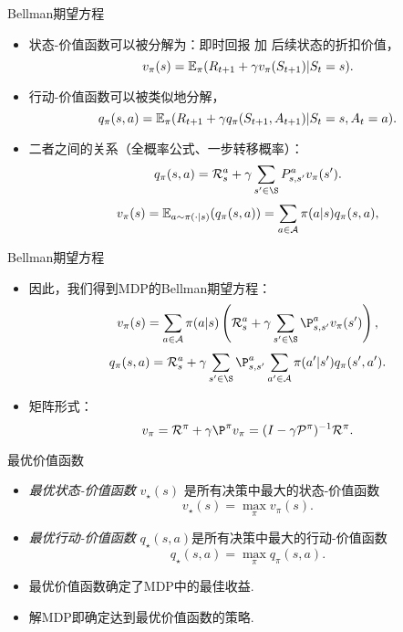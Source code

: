\begin{frame}{Bellman期望方程}
\begin{itemize}
    \item 状态-价值函数可以被分解为：即时回报 加 后续状态的折扣价值，
\[v_\pi(s) = \mathbb{E}_\pi(R_{t+1} + \gamma v_\pi(S_{t+1})|S_t=s).\]
\item 行动-价值函数可以被类似地分解，
\[q_\pi(s,a) = \mathbb{E}_\pi(R_{t+1} + \gamma q_\pi(S_{t+1},A_{t+1})|S_t=s,A_t=a).\]
\item 二者之间的关系（全概率公式、一步转移概率）：
\[q_\pi(s,a) =\mathcal R_s^a + \gamma \sum_{s'\in \S}P_{s,s'}^a v_\pi(s').\]
\[v_\pi(s) = \mathbb{E}_{a\sim\pi(\cdot|s)}(q_\pi(s,a))=\sum_{a\in\mathcal A}\pi(a|s)q_\pi(s,a),\]
\end{itemize}
\end{frame}

\begin{frame}{Bellman期望方程}
\begin{itemize}
    \item 因此，我们得到MDP的Bellman期望方程：
\[v_\pi(s) = \sum_{a\in \mathcal A}\pi(a|s)\left(\mathcal R_s^a + \gamma \sum_{s'\in \S}\P_{s,s'}^av_\pi(s')\right),\]
\[q_\pi(s,a) = \mathcal R_s^a + \gamma \sum_{s'\in \S}\P_{s,s'}^a \sum_{a'\in \mathcal A}\pi(a'|s')q_\pi(s',a').\]
\item 矩阵形式：
\[v_\pi = \mathcal R^\pi + \gamma \P^\pi v_\pi = (I-\gamma \mathcal P^\pi)^{-1}\mathcal R^\pi.\]
\end{itemize}
\end{frame}

\begin{frame}{最优价值函数}
\begin{itemize}
    \item \emph{最优状态-价值函数} $v_\star(s)$ 是所有决策中最大的状态-价值函数
    \[v_\star(s) = \max_\pi v_\pi(s).\]
    \item \emph{最优行动-价值函数} $q_\star(s,a)$是所有决策中最大的行动-价值函数
    \[q_\star(s,a) = \max_\pi q_\pi(s,a).\]
    \item 最优价值函数确定了MDP中的最佳收益.
    \item 解MDP即确定达到最优价值函数的策略.
\end{itemize}
\end{frame}

